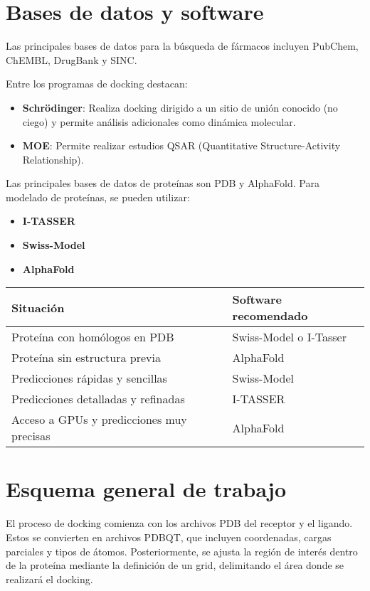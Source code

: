 \section{Bases de datos y software}
Las principales bases de datos para la búsqueda de fármacos incluyen PubChem, ChEMBL, DrugBank y SINC.

Entre los programas de docking destacan:
\begin{itemize}
\item \textbf{Schrödinger}: Realiza docking dirigido a un sitio de unión conocido (no ciego) y permite análisis adicionales como dinámica molecular.
\item \textbf{MOE}: Permite realizar estudios QSAR (Quantitative Structure-Activity Relationship).
\end{itemize}

Las principales bases de datos de proteínas son PDB y AlphaFold. Para modelado de proteínas, se pueden utilizar:
\begin{itemize}
\item \textbf{I-TASSER}
\item \textbf{Swiss-Model}
\item \textbf{AlphaFold}
\end{itemize}

\begin{table}[h]
\centering
\begin{tabular}{l l}
Situación & Software recomendado \\ \hline
Proteína con homólogos en PDB & Swiss-Model o I-Tasser \\
Proteína sin estructura previa & AlphaFold \\
Predicciones rápidas y sencillas & Swiss-Model \\
Predicciones detalladas y refinadas & I-TASSER \\
Acceso a GPUs y predicciones muy precisas & AlphaFold
\end{tabular}
\end{table}

\section{Esquema general de trabajo}
El proceso de docking comienza con los archivos PDB del receptor y el ligando. Estos se convierten en archivos PDBQT, que incluyen coordenadas, cargas parciales y tipos de átomos. Posteriormente, se ajusta la región de interés dentro de la proteína mediante la definición de un grid, delimitando el área donde se realizará el docking.

